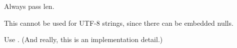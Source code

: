 \begin{DoxyRefList}
\item[Global \doxylink{classJson_1_1Value_a29f3a30f7e5d3af6f38d57999bf5b480}{Json\+::Value\+::set\+Comment} (const char \texorpdfstring{$\ast$}{*}comment, Comment\+Placement placement)]\label{deprecated__deprecated000005}%
%
Always pass len.  
\item[Global \doxylink{classJson_1_1ValueIteratorBase_a54765da6759fd3f1edcbfbaf308ec263}{Json\+::Value\+Iterator\+Base\+::member\+Name} () const]\label{deprecated__deprecated000006}%
%
This cannot be used for UTF-\/8 strings, since there can be embedded nulls.  
\item[Class \doxylink{classJson_1_1Writer}{Json\+::Writer} ]\label{deprecated__deprecated000007}%
%
Use . (And really, this is an implementation detail.) 
\end{DoxyRefList}